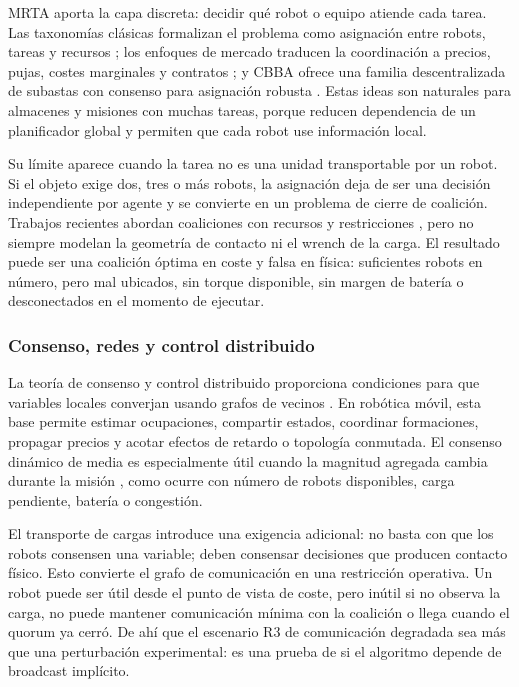 MRTA aporta la capa discreta: decidir qué robot o equipo atiende cada tarea. Las
taxonomías clásicas formalizan el problema como asignación entre robots, tareas y
recursos \citep{gerkey2004formal,korsah2013taxonomy}; los enfoques de mercado traducen
la coordinación a precios, pujas, costes marginales y contratos
\citep{dias2006market}; y CBBA ofrece una familia descentralizada de subastas con
consenso para asignación robusta \citep{choi2009consensus}. Estas ideas son naturales
para almacenes y misiones con muchas tareas, porque reducen dependencia de un planificador
global y permiten que cada robot use información local.

Su límite aparece cuando la tarea no es una unidad transportable por un robot. Si el
objeto exige dos, tres o más robots, la asignación deja de ser una decisión independiente
por agente y se convierte en un problema de cierre de coalición. Trabajos recientes
abordan coaliciones con recursos y restricciones \citep{dutta2021hedonic,zhang2024coalition},
pero no siempre modelan la geometría de contacto ni el wrench de la carga. El resultado
puede ser una coalición óptima en coste y falsa en física: suficientes robots en número,
pero mal ubicados, sin torque disponible, sin margen de batería o desconectados en el
momento de ejecutar.

\subsubsection{Consenso, redes y control distribuido}

La teoría de consenso y control distribuido proporciona condiciones para que variables
locales converjan usando grafos de vecinos \citep{olfati2004consensus,olfati2007consensus,
ren2008distributed,bullo2009distributed}. En robótica móvil, esta base permite estimar
ocupaciones, compartir estados, coordinar formaciones, propagar precios y acotar efectos
de retardo o topología conmutada. El consenso dinámico de media es especialmente útil
cuando la magnitud agregada cambia durante la misión \citep{kia2019tutorial}, como ocurre
con número de robots disponibles, carga pendiente, batería o congestión.

El transporte de cargas introduce una exigencia adicional: no basta con que los robots
consensen una variable; deben consensar decisiones que producen contacto físico. Esto
convierte el grafo de comunicación en una restricción operativa. Un robot puede ser
útil desde el punto de vista de coste, pero inútil si no observa la carga, no puede
mantener comunicación mínima con la coalición o llega cuando el quorum ya cerró. De ahí
que el escenario R3 de comunicación degradada sea más que una perturbación experimental:
es una prueba de si el algoritmo depende de broadcast implícito.

